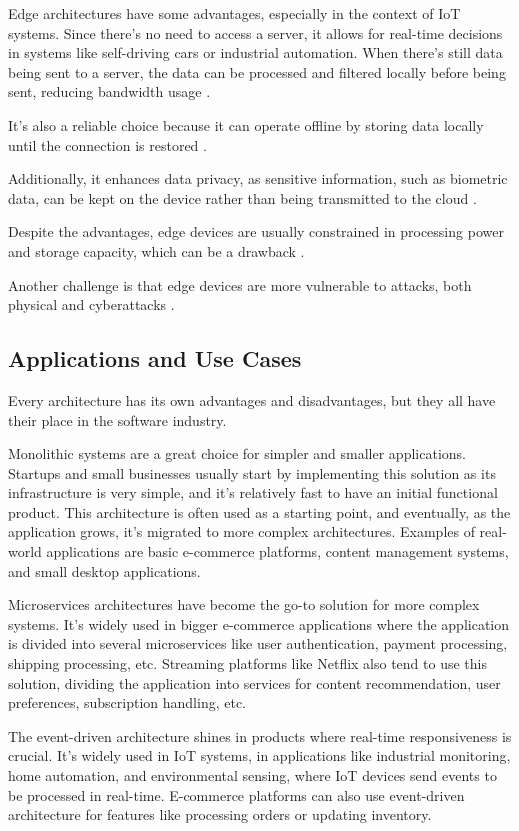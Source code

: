 Edge architectures have some advantages, especially in the context of IoT systems.
Since there's no need to access a server, it allows for real-time decisions
in systems like self-driving cars or industrial automation. When there's
still data being sent to a server, the data can be processed and filtered
locally before being sent, reducing bandwidth usage \cite{s20226441}.

It's also a reliable choice because it can operate offline by storing data
locally until the connection is restored \cite{MicrosoftEdgeComputing}.

Additionally, it enhances data privacy, as sensitive information, such as biometric data,
can be kept on the device rather than being transmitted to the cloud \cite{MicrosoftEdgeComputing}.

Despite the advantages, edge devices are usually constrained in processing power
and storage capacity, which can be a drawback \cite{s20226441}.

Another challenge is that edge devices are more vulnerable to attacks, both
physical and cyberattacks \cite{s20226441}.

\subsection{Applications and Use Cases}
Every architecture has its own advantages and disadvantages, but they all have
their place in the software industry.

Monolithic systems are a great choice for simpler and smaller applications.
Startups and small businesses usually start by implementing this solution as
its infrastructure is very simple, and it's relatively fast to have an initial
functional product. This architecture is often used as a starting point, and
eventually, as the application grows, it's migrated to more complex architectures.
Examples of real-world applications are basic e-commerce platforms, content
management systems, and small desktop applications.

Microservices architectures have become the go-to solution for more complex
systems. It's widely used in bigger e-commerce applications where the application
is divided into several microservices like user authentication, payment processing,
shipping processing, etc. Streaming platforms like Netflix also tend to use this
solution, dividing the application into services for content recommendation, user
preferences, subscription handling, etc.

The event-driven architecture shines in products where real-time
responsiveness is crucial. It's widely used in \gls{IoT} systems, in
applications like industrial monitoring, home automation, and environmental
sensing, where \gls{IoT} devices send events to be processed in real-time.
E-commerce platforms can also use event-driven architecture for
features like processing orders or updating inventory.

